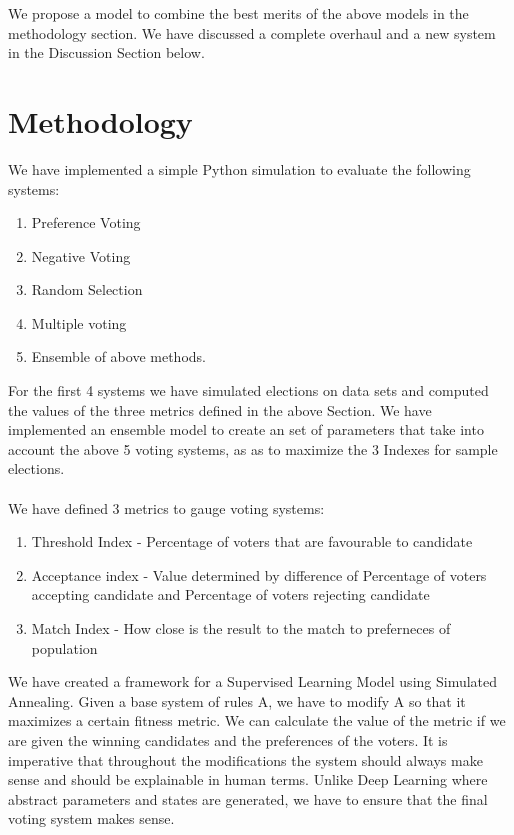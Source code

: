 \documentclass[a4paper]{article}
\begin{document}
We propose a model to combine the best merits of the above models in the methodology section. We have discussed a complete overhaul and a new system in the Discussion Section below.

\section{Methodology}

We have implemented a simple Python simulation to evaluate the following systems:
\begin{enumerate}
\item Preference Voting 
\item Negative Voting 
\item Random Selection 
\item Multiple voting 
\item Ensemble of above methods. 
\end{enumerate}

For the first 4 systems we have simulated elections on data sets and computed the values of the three metrics defined in the above Section. We have implemented an ensemble model to create an set of parameters that take into account the above 5 voting systems, as as to maximize the 3 Indexes for sample elections.
\\
\\
We have defined 3 metrics to gauge voting systems:
\begin{enumerate}
\item Threshold Index - Percentage of voters that are favourable to candidate
\item Acceptance index - Value determined by difference of Percentage of voters accepting candidate and Percentage of voters rejecting candidate
\item Match Index - How close is the result to the match to preferneces of population
\end{enumerate}

We have created a framework for a Supervised Learning Model using Simulated Annealing. 
Given a base system of rules A, we have to modify A so that it maximizes a certain fitness metric. We can calculate the value of the metric if we are given the winning candidates and the preferences of the voters. It is imperative that throughout the modifications the system should always make sense and should be explainable in human terms. Unlike Deep Learning where abstract parameters and states are generated, we have to ensure that the final voting system makes sense.
\end{document}
